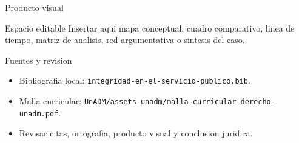 \documentclass[
  spanish,
  aspectratio=169,
  xcolor={dvipsnames,table}
]{beamer}
\begin{document}
\begin{frame}{Producto visual}
  \begin{block}{Espacio editable}
    Insertar aqui mapa conceptual, cuadro comparativo, linea de tiempo,
    matriz de analisis, red argumentativa o sintesis del caso.
  \end{block}
  \centering
\end{frame}

\begin{frame}{Fuentes y revision}
  \begin{itemize}
    \item Bibliografia local: \texttt{integridad-en-el-servicio-publico.bib}.
    \item Malla curricular: \texttt{UnADM/assets-unadm/malla-curricular-derecho-unadm.pdf}.
    \item Revisar citas, ortografia, producto visual y conclusion juridica.
  \end{itemize}
\end{frame}
\end{document}
